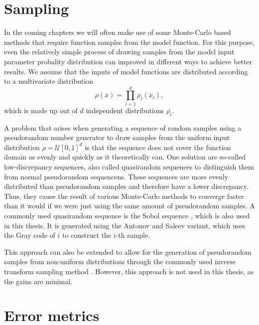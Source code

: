 \documentclass[
  a4paper,  %
  twoside,  %
  bibliography=totoc,
  headsepline,
  cleardoublepage=empty,
  parskip=half,
  draft=false
]{scrbook}
\begin{document}
\section{Sampling}
\label{sec:lds}

In the coming chapters we will often make use of some Monte-Carlo based methods that require function samples from the model function.
For this purpose, even the relatively simple process of drawing samples from the model input parameter probality distribution can improved in different ways to achieve better results.
We assume that the inputs of model functions are distributed according to a multivariate distribution
\begin{equation}
\rho(x)=\prod_{i=1}^d \rho_i(x_i),
\end{equation}
which is made up out of $d$ independent distributions $\rho_i$.

A problem that arises when generating a sequence of random samples using a pseudorandom number generator to draw samples from the uniform input distribution $\rho=\mathcal{U}[0,1]^d$ is that the sequence does not cover the function domain as evenly and quickly as it theoretically can.
One solution are so-called low-discrepancy sequences, also called quasirandom sequences to distinguish them from normal pseudorandom sequencens.
These sequences are more evenly distributed than pseudorandom samples and therefore have a lower discrepancy.
Thus, they cause the result of various Monte-Carlo methods to converge faster than it would if we were just using the same amount of pseudorandom samples.
A commonly used quasirandom sequence is the Sobol sequence \cite{Niederreiter1988}, which is also used in this thesis.
It is generated using the Antonov and Saleev variant, which uses the Gray code of $i$ to construct the $i$-th sample.

This approach can also be extended to allow for the generation of pseudorandom samples from non-uniform distributions through the commonly used inverse transform sampling method \cite{Devroye1986}.
However, this approach is not used in this thesis, as the gains are minimal.

\section{Error metrics}
\label{sec:errors}
\end{document}
